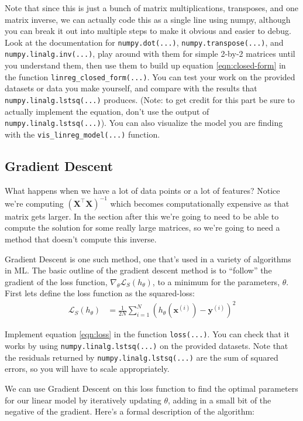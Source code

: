 \documentclass{article} %
\begin{document}
Note that since this is just a bunch of matrix multiplications, transposes, and one matrix inverse, we can actually code this
as a single line using numpy, although you can break it out into multiple steps to make it obvious and easier to debug. Look 
at the documentation for \texttt{numpy.dot(...)}, \texttt{numpy.transpose(...)}, and \texttt{numpy.linalg.inv(...)}, play 
around with them for simple 2-by-2 matrices until you understand them, then use them to build up equation 
\ref{eqn:closed-form} in the function \texttt{linreg\_closed\_form(...)}. You can test your work on the provided datasets or 
data you make yourself, and compare with the results that \texttt{numpy.linalg.lstsq(...)} produces. (Note: to get credit for 
this part be sure to actually implement the equation, don't use the output of \texttt{numpy.linalg.lstsq(...)}). You can also 
visualize the model you are finding with the \texttt{vis\_linreg\_model(...)} function.

\subsection*{Gradient Descent}
What happens when we have a lot of data points or a lot of features? Notice we're computing 
\(\left(\mathbf{X}^\top\mathbf{X}\right)^{-1}\) 
which becomes computationally expensive as that matrix gets larger. In the section after this we're going to need to be able 
to compute the solution for some really large matrices, so we're going to need a method that doesn't compute this inverse.

Gradient Descent is one such method, one that's used in a variety of algorithms in ML. The basic outline of the gradient 
descent method is to ``follow'' the gradient of the loss function, \(\nabla_\theta\mathcal{L}_S(h_\theta)\), to a minimum for the 
parameters, \(\theta\). First lets define the loss function as the squared-loss:
\begin{align}
	\mathcal{L}_S(h_\theta) &= \frac{1}{2N} \sum_{i=1}^N \left(h_\theta(\mathbf{x}^{(i)})-\mathbf{y}^{(i)}\right)^2 \label{eqn:loss}
\end{align}

Implement equation \ref{eqn:loss} in the function \texttt{loss(...)}. You can check that it works by using 
\texttt{numpy.linalg.lstsq(...)} on the provided datasets. Note that the residuals returned by 
\texttt{numpy.linalg.lstsq(...)} are the sum of squared errors, so you will have to scale appropriately.

We can use Gradient Descent on this loss function to find the optimal parameters for our linear model by iteratively updating 
\(\theta\), adding in a small bit of the negative of the gradient. Here's a formal description of the algorithm:
\end{document}
